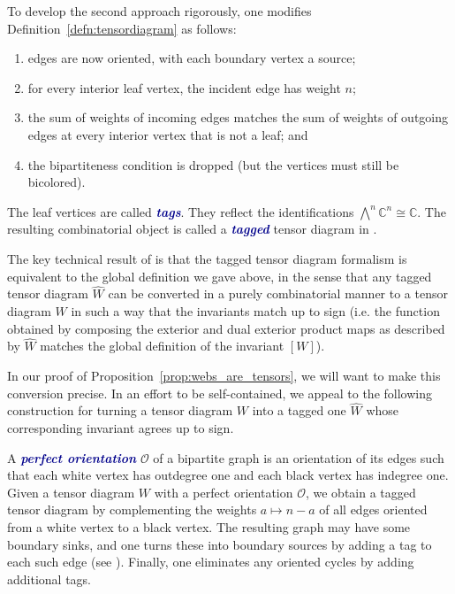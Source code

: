 \documentclass[10pt]{amsart}
\theoremstyle{definition}
\theoremstyle{plain}
\theoremstyle{plain}
\theoremstyle{definition}
\theoremstyle{remark}
\theoremstyle{plain}
\theoremstyle{plain}
\theoremstyle{plain}
\numberwithin{equation}{section}
\newcommand{\newword}[1]{\textcolor{darkblue}{\textbf{\emph{#1}}}}
\begin{document}
To develop the second approach rigorously, one modifies Definition~\ref{defn:tensordiagram} as follows: 
\begin{enumerate}
    \item edges are now oriented, with each boundary vertex a source;
    \item for every interior leaf vertex, the incident edge has weight $n$; 
    \item the sum of weights of incoming edges matches the sum of weights of outgoing edges at every interior vertex that is not a leaf; and 
    \item the bipartiteness condition is dropped (but the vertices must still be bicolored).
\end{enumerate} 
The leaf vertices are called \newword{tags}. They reflect the identifications $\bigwedge^n \mathbb{C}^n \cong \mathbb{C}$. The resulting combinatorial object is called a \newword {tagged} tensor diagram in \cite{Fraser.Lam.Le}. 

The key technical result of \cite{Fraser.Lam.Le} is that the tagged tensor diagram formalism is equivalent to the global definition we gave above, in the sense that any tagged tensor diagram $\widehat{W}$ can be converted in a purely combinatorial manner to a tensor diagram $W$ in such a way that the invariants match up to sign (i.e. the function obtained by composing the exterior and dual exterior product maps as described by $\widehat{W}$ matches the global definition of the invariant $[W]$). 

In our proof of Proposition~\ref{prop:webs_are_tensors}, we will want to make this conversion precise. 
In an effort to be self-contained, we appeal to the following construction \cite[Remark 3.3]{Fraser.Lam.Le} for turning a tensor diagram $W$ into a tagged one $\widehat{W}$ whose corresponding invariant agrees up to sign. 

A \newword{perfect orientation} $\mathcal{O}$ of a bipartite graph is an orientation of its edges such that each white vertex has outdegree one and each black vertex has indegree one. Given a tensor diagram $W$ with a perfect orientation $\mathcal{O}$, we obtain a tagged tensor diagram 
by complementing the weights $a \mapsto n-a$ of all edges oriented from a white vertex to a black vertex. The resulting graph may have some boundary sinks, and one turns these into boundary sources by adding a tag to each such edge (see \cite[Eq.~(3.3)]{Fraser.Lam.Le}). Finally, one eliminates any oriented cycles by adding additional tags.
\end{document}
